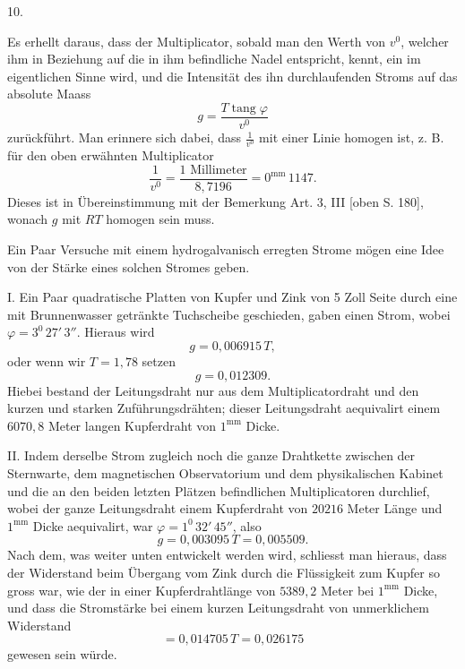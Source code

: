 \clearpage\begingroup
{}
\begin{center}10.\end{center}
\noindent\hspace*{\parindent}Es erhellt daraus, dass der Multiplicator, sobald man den Werth von $v^0$, welcher ihm in Beziehung auf die in ihm befindliche Nadel entspricht, kennt, ein  im eigentlichen Sinne wird, und die Intensität des ihn durchlaufenden Stroms auf das absolute Maass
\[
g=\frac{T\operatorname{tang}\varphi}{v^0}
\]
\noindent zurückführt. Man erinnere sich dabei, dass $\frac{1}{v^0}$ mit einer Linie homogen ist, z. B. für den oben erwähnten Multiplicator
\[
\frac{1}{v^0}=\frac{1\text{ Millimeter}}{8{,}7196}=0^{\mathrm{mm}}\,1147.
\]
\noindent Dieses ist in Übereinstimmung mit der Bemerkung Art. 3, III [oben S. 180], wonach $g$ mit $RT$ homogen sein muss.

Ein Paar Versuche mit einem hydrogalvanisch erregten Strome mögen eine Idee von der Stärke eines solchen Stromes geben.

I. Ein Paar quadratische Platten von Kupfer und Zink von 5 Zoll Seite durch eine mit Brunnenwasser getränkte Tuchscheibe geschieden, gaben einen Strom, wobei $\varphi=3^0\,27'\,3''$. Hieraus wird
\[
g=0{,}006915\,T,
\]
\noindent oder wenn wir $T=1{,}78$ setzen
\[
g=0{,}012309.
\]
\noindent Hiebei bestand der Leitungsdraht nur aus dem Multiplicatordraht und den kurzen und starken Zuführungsdrähten; dieser Leitungsdraht aequivalirt einem $6070{,}8$ Meter langen Kupferdraht von $1^{\mathrm{mm}}$ Dicke.

II. Indem derselbe Strom zugleich noch die ganze Drahtkette zwischen der Sternwarte, dem magnetischen Observatorium und dem physikalischen Kabinet und die an den beiden letzten Plätzen befindlichen Multiplicatoren durchlief, wobei der ganze Leitungsdraht einem Kupferdraht von $20216$ Meter Länge und $1^{\mathrm{mm}}$ Dicke aequivalirt, war $\varphi=1^0\,32'\,45''$, also
\[
g=0{,}003095\,T=0{,}005509.
\]
\clearpage{}
\noindent Nach dem, was weiter unten entwickelt werden wird, schliesst man hieraus, dass der Widerstand beim Übergang vom Zink durch die Flüssigkeit zum Kupfer so gross war, wie der in einer Kupferdrahtlänge von $5389{,}2$ Meter bei $1^{\mathrm{mm}}$ Dicke, und dass die Stromstärke bei einem kurzen Leitungsdraht von unmerklichem Widerstand
\[
=0{,}014705\,T=0{,}026175
\]
\noindent gewesen sein würde.

